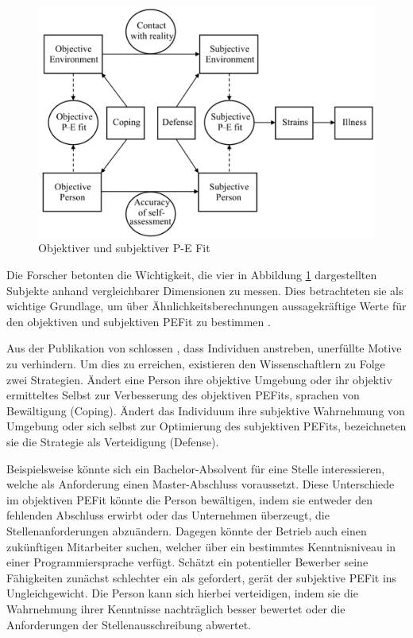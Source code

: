 \begin{figure}[h]
	\centering
	\includegraphics[width=1\textwidth]{gfx/subjektivObjektivPEFit.png}
	\caption{Objektiver und subjektiver P-E Fit \cite[S. 22]{edwards:2008}}
	\label{fig:personEnvironmentFit:subjektivObjektiv:abb1}
\end{figure}

Die Forscher betonten die Wichtigkeit, die vier in Abbildung \ref{fig:personEnvironmentFit:subjektivObjektiv:abb1} dargestellten Subjekte anhand vergleichbarer Dimensionen zu messen. Dies betrachteten sie als wichtige Grundlage, um über Ähnlichkeitsberechnungen aussagekräftige Werte für den objektiven und subjektiven \ac{PEFit} zu bestimmen \cite[S. 2f.]{copingAndAdaption:1974}.

Aus der Publikation von \textcite[S. 10ff.]{french:1962} schlossen \textcite[S. 15]{copingAndAdaption:1974}, dass Individuen anstreben, unerfüllte Motive zu verhindern. Um dies zu erreichen, existieren den Wissenschaftlern zu Folge zwei Strategien. Ändert eine Person ihre objektive Umgebung oder ihr objektiv ermitteltes Selbst zur Verbesserung des objektiven \acp{PEFit}, sprachen \textcite[S. 15f.]{copingAndAdaption:1974} von Bewältigung (Coping). Ändert das Individuum ihre subjektive Wahrnehmung von Umgebung oder sich selbst zur Optimierung des subjektiven \acp{PEFit}, bezeichneten sie die Strategie als Verteidigung (Defense).

Beispielsweise könnte sich ein Bachelor-Absolvent für eine Stelle interessieren, welche als Anforderung einen Master-Abschluss voraussetzt. Diese Unterschiede im objektiven \ac{PEFit} könnte die Person bewältigen, indem sie entweder den fehlenden Abschluss erwirbt oder das Unternehmen überzeugt, die Stellenanforderungen abzuändern. Dagegen könnte der Betrieb auch einen zukünftigen Mitarbeiter suchen, welcher über ein bestimmtes Kenntnisniveau in einer Programmiersprache verfügt. Schätzt ein potentieller Bewerber seine Fähigkeiten zunächst schlechter ein als gefordert, gerät der subjektive \ac{PEFit} ins Ungleichgewicht. Die Person kann sich hierbei verteidigen, indem sie die Wahrnehmung ihrer Kenntnisse nachträglich besser bewertet oder die Anforderungen der Stellenausschreibung abwertet.

